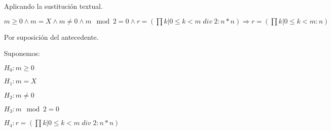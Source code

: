 \documentclass[hidelinks]{article}
\begin{document}
Aplicando la sustitución textual.\par

$m \geq 0 \land m = X \land m \neq 0 \land m \mod 2 = 0 \land r = (\prod k | 0 \leq k < m \; div \; 2: n * n) \Rightarrow r = (\prod k | 0 \leq k < m: n) $\par

Por suposición del antecedente.\par

Suponemos: \par
$H_0: m \geq 0$\par
$H_1: m = X$\par
$H_2: m \neq 0$\par
$H_3: m \mod 2 = 0$\par
$H_4: r = (\prod k | 0 \leq k < m \; div \; 2: n * n)$\par
\end{document}
